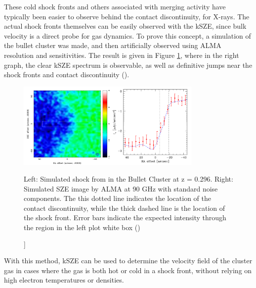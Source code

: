 \documentclass[manuscript]{aastex}
\begin{document}
These cold shock fronts and others associated with merging activity have typically been easier to observe behind the contact discontinuity, for X-rays. The actual shock fronts themselves can be easily observed with the kSZE, since bulk velocity is a direct probe for gas dynamics. To prove this concept, a simulation of the bullet cluster was made, and then artificially observed using ALMA resolution and sensitivities. The result is given in Figure \ref{fig:bulletcluster}, where in the right graph, the clear kSZE spectrum is observable, as well as definitive jumps near the shock fronts and contact discontinuity (\cite{Kitayama2014}). 

\begin{figure}[h!]
\centering
\captionsetup{width=0.8\textwidth}
\includegraphics[width=0.8\textwidth]{bulletcluster.png}
\caption[ Bullet Cluster Simulated Shock Front kSZE Detection -[\cite{Kitayama2014}]]{Left: Simulated shock from in the Bullet Cluster at z = 0.296. Right: Simulated SZE image by ALMA at 90 GHz with standard noise components. The this dotted line indicates the location of the contact discontinuity, while the thick dashed line is the location of the shock front. Error bars indicate the expected intensity through the region in the left plot white box (\cite{Kitayama2014})}
\label{fig:bulletcluster}
\end{figure}
With this method, kSZE can be used to determine the velocity field of the cluster gas in cases where the gas is both hot or cold in a shock front, without relying on high electron temperatures or densities. 

\end{document}

